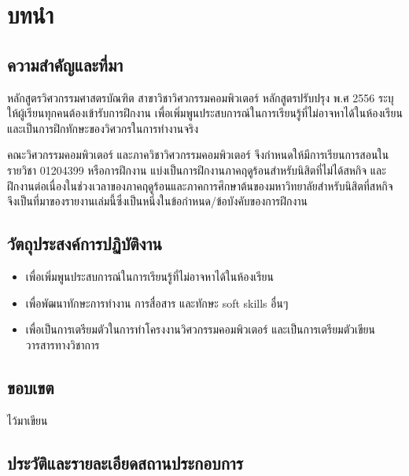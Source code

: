 \documentclass[16pt,a4]{internshipreport}
\begin{document}
\tableofcontents

\listoffigures

\listoftables

\chapter{บทนำ}

\section{ความสำคัญและที่มา}
หลักสูตรวิศวกรรมศาสตรบัณฑิต สาขาวิชาวิศวกรรมคอมพิวเตอร์ หลักสูตรปรับปรุง พ.ศ 2556 ระบุให้ผู้เรียนทุกคนต้องเข้ารับการฝึกงาน เพื่อเพิ่มพูนประสบการณ์ในการเรียนรู้ที่ไม่อาจหาได้ในห้องเรียน และเป็นการฝึกทักษะของวิศวกรในการทำงานจริง

คณะวิศวกรรมคอมพิวเตอร์ และภาควิชาวิศวกรรมคอมพิวเตอร์ จึงกำหนดให้มีการเรียนการสอนในรายวิชา 01204399 หรือการฝึกงาน แบ่งเป็นการฝึกงานภาคฤดูร้อนสำหรับนิสิตที่ไม่ได้สหกิจ และฝึกงานต่อเนื่องในช่วงเวลาของภาคฤดูร้อนและภาคการศึกษาต้นของมหาวิทยาลัยสำหรับนิสิตที่สหกิจ จึงเป็นที่มาของรายงานเล่มนี้ซึ่งเป็นหนึ่งในข้อกำหนด/ข้อบังคับของการฝึกงาน

\section{วัตถุประสงค์การปฏิบัติงาน}
\begin{itemize}
    \item เพื่อเพิ่มพูนประสบการณ์ในการเรียนรู้ที่ไม่อาจหาได้ในห้องเรียน
    \item เพื่อพัฒนาทักษะการทำงาน การสื่อสาร และทักษะ soft skills อื่นๆ
    \item เพื่อเป็นการเตรียมตัวในการทำโครงงานวิศวกรรมคอมพิวเตอร์ และเป็นการเตรียมตัวเขียนวารสารทางวิชาการ
\end{itemize}

\section{ขอบเขต}
ไว้มาเขียน

\section{ประวัติและรายละเอียดสถานประกอบการ}
\end{document}
